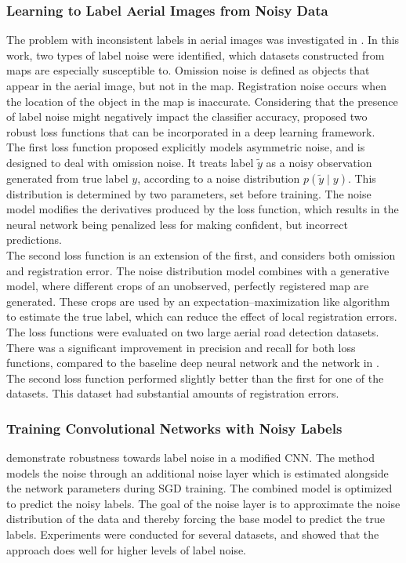 \subsubsection{Learning to Label Aerial Images from Noisy Data}
The problem with inconsistent labels in aerial images was investigated in \citep{Mnih_aerial_images_noisy}. In this work, two types of label noise were identified,  which datasets constructed from maps are especially susceptible to. Omission noise is defined as objects that appear in the aerial image, but not in the map. Registration noise occurs when the location of the object in the map is inaccurate. Considering that the presence of label noise might negatively impact the classifier accuracy, \cite{Mnih_aerial_images_noisy} proposed two robust loss functions that can be incorporated in a deep learning framework. \\

The first loss function proposed explicitly models asymmetric noise, and is designed to deal with omission noise. It treats label $\tilde{y}$ as a noisy observation generated from true label $y$, according to a noise distribution $p(\tilde{y} \mid y)$. This distribution is determined by two parameters, set before training. The noise model modifies the derivatives produced by the loss function, which results in the neural network being penalized less for making confident, but incorrect predictions. \\

The second loss function is an extension of the first, and considers both omission and registration error. The noise distribution model combines with a generative model, where different crops of an unobserved, perfectly registered map are generated. These crops are used by an expectation–maximization like algorithm to estimate the true label, which can reduce the effect of local registration errors.\\


The loss functions were evaluated on two large aerial road detection datasets. There was a significant improvement in precision and recall for both loss functions, compared to the baseline deep neural network and the network in \citep{Mnih_roads_high_res_aerial_images}. The second loss function performed slightly better than the first for one of the datasets. This dataset had substantial amounts of registration errors.\\


\subsubsection{Training Convolutional Networks with Noisy Labels}
\cite{Sukhbaatar_noisy_network_learning} demonstrate robustness towards label noise in a modified \ac{CNN}. The method models the noise through an additional noise layer which is estimated alongside the network parameters during \ac{SGD} training. The combined model is optimized to predict the noisy labels. The goal of the noise layer is to approximate the noise distribution of the data and thereby forcing the base model to predict the true labels. Experiments were conducted for several datasets, and showed that the approach does well for higher levels of label noise. \\

